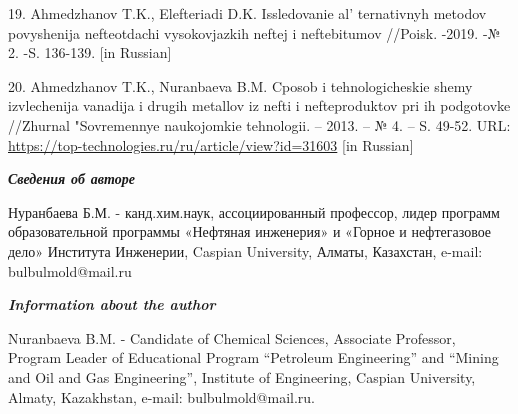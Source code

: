 \begin{references}
19. Ahmedzhanov T.K., Elefteriadi D.K. Issledovanie
al' ternativnyh metodov povyshenija nefteotdachi
vysokovjazkih neftej i neftebitumov //Poisk. -2019. -№ 2. -S. 136-139.
{[}in Russian{]}

20. Ahmedzhanov T.K., Nuranbaeva B.M. Cposob i tehnologicheskie shemy
izvlechenija vanadija i drugih metallov iz nefti i nefteproduktov pri ih
podgotovke //Zhurnal "Sovremennye naukojomkie tehnologii. -- 2013. -- №
4. -- S. 49-52. URL:
\url{https://top-technologies.ru/ru/article/view?id=31603} {[}in
Russian{]}
\end{references}


\begin{authorinfo}
  \hspace{1em}\emph{{\bfseries Сведения об авторе}}

Нуранбаева Б.М. - канд.хим.наук, ассоциированный профессор, лидер
программ образовательной программы «Нефтяная инженерия» и «Горное и
нефтегазовое дело» Института Инженерии, Caspian University, Алматы,
Казахстан, e-mail: bulbulmold@mail.ru

\hspace{1em}\emph{{\bfseries Information about the author}}

Nuranbaeva B.M. - Candidate of Chemical Sciences, Associate Professor, Program Leader of Educational Program
“Petroleum Engineering” and “Mining and Oil and Gas Engineering”, Institute of Engineering, Caspian University,
Almaty, Kazakhstan, e-mail: bulbulmold@mail.ru.
\end{authorinfo}

